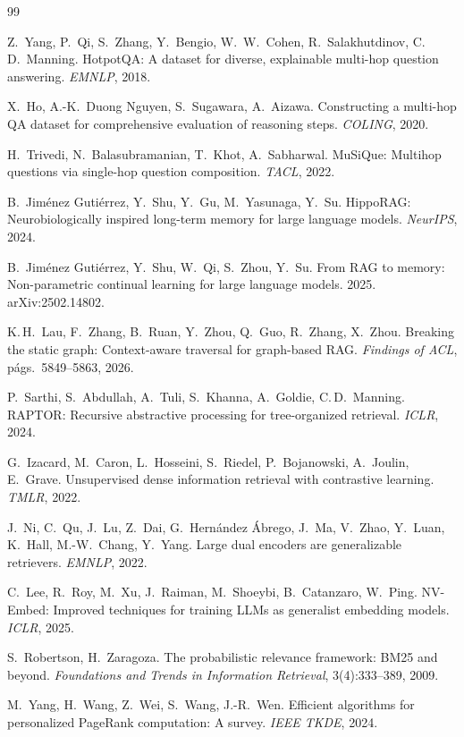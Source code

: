 \documentclass[11pt,a4paper]{article}
\begin{document}
\begin{thebibliography}{99}\small

 Z.~Yang, P.~Qi, S.~Zhang, Y.~Bengio, W.~W.~Cohen,
R.~Salakhutdinov, C.\,D.~Manning. HotpotQA: A dataset for diverse,
explainable multi-hop question answering. \emph{EMNLP}, 2018.

 X.~Ho, A.-K.~Duong Nguyen, S.~Sugawara, A.~Aizawa.
Constructing a multi-hop QA dataset for comprehensive evaluation of
reasoning steps. \emph{COLING}, 2020.

 H.~Trivedi, N.~Balasubramanian, T.~Khot, A.~Sabharwal.
MuSiQue: Multihop questions via single-hop question composition.
\emph{TACL}, 2022.

 B.~Jiménez Gutiérrez, Y.~Shu, Y.~Gu, M.~Yasunaga,
Y.~Su. HippoRAG: Neurobiologically inspired long-term memory for large
language models. \emph{NeurIPS}, 2024.

 B.~Jiménez Gutiérrez, Y.~Shu, W.~Qi, S.~Zhou, Y.~Su.
From RAG to memory: Non-parametric continual learning for large language
models. 2025. arXiv:2502.14802.

 K.\,H.~Lau, F.~Zhang, B.~Ruan, Y.~Zhou, Q.~Guo,
R.~Zhang, X.~Zhou. Breaking the static graph: Context-aware traversal for
graph-based RAG. \emph{Findings of ACL}, págs.~5849--5863, 2026.

 P.~Sarthi, S.~Abdullah, A.~Tuli, S.~Khanna, A.~Goldie,
C.\,D.~Manning. RAPTOR: Recursive abstractive processing for
tree-organized retrieval. \emph{ICLR}, 2024.

 G.~Izacard, M.~Caron, L.~Hosseini, S.~Riedel,
P.~Bojanowski, A.~Joulin, E.~Grave. Unsupervised dense information
retrieval with contrastive learning. \emph{TMLR}, 2022.

 J.~Ni, C.~Qu, J.~Lu, Z.~Dai, G.~Hernández Ábrego, J.~Ma,
V.~Zhao, Y.~Luan, K.~Hall, M.-W.~Chang, Y.~Yang. Large dual encoders are
generalizable retrievers. \emph{EMNLP}, 2022.

 C.~Lee, R.~Roy, M.~Xu, J.~Raiman, M.~Shoeybi,
B.~Catanzaro, W.~Ping. NV-Embed: Improved techniques for training LLMs as
generalist embedding models. \emph{ICLR}, 2025.

 S.~Robertson, H.~Zaragoza. The probabilistic relevance
framework: BM25 and beyond. \emph{Foundations and Trends in Information
Retrieval}, 3(4):333--389, 2009.

 M.~Yang, H.~Wang, Z.~Wei, S.~Wang, J.-R.~Wen.
Efficient algorithms for personalized PageRank computation: A survey.
\emph{IEEE TKDE}, 2024.

\end{thebibliography}
\end{document}
